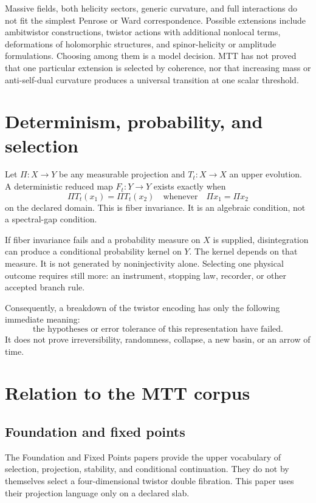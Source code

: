 \documentclass[11pt]{article}
\begin{document}
Massive fields, both helicity sectors, generic curvature, and full
interactions do not fit the simplest Penrose or Ward correspondence.
Possible extensions include ambitwistor constructions, twistor actions with
additional nonlocal terms, deformations of holomorphic structures, and
spinor-helicity or amplitude formulations. Choosing among them is a model
decision. MTT has not proved that one particular extension is selected by
coherence, nor that increasing mass or anti-self-dual curvature produces a
universal transition at one scalar threshold.

\section{Determinism, probability, and selection}

Let \(\Pi:X\to Y\) be any measurable projection and \(T_t:X\to X\) an upper
evolution. A deterministic reduced map \(F_t:Y\to Y\) exists exactly when
\[
\Pi T_t(x_1)=\Pi T_t(x_2)
\quad\text{whenever}\quad
\Pi x_1=\Pi x_2
\]
on the declared domain. This is fiber invariance. It is an algebraic
condition, not a spectral-gap condition.

If fiber invariance fails and a probability measure on \(X\) is supplied,
disintegration can produce a conditional probability kernel on \(Y\).
The kernel depends on that measure. It is not generated by noninjectivity
alone. Selecting one physical outcome requires still more: an instrument,
stopping law, recorder, or other accepted branch rule.

Consequently, a breakdown of the twistor encoding has only the following
immediate meaning:
\[
\text{the hypotheses or error tolerance of this representation have failed.}
\]
It does not prove irreversibility, randomness, collapse, a new basin, or an
arrow of time.

\section{Relation to the MTT corpus}

\subsection{Foundation and fixed points}

The Foundation and Fixed Points papers provide the upper vocabulary of
selection, projection, stability, and conditional continuation. They do not
by themselves select a four-dimensional twistor double fibration. This paper
uses their projection language only on a declared slab.
\end{document}
